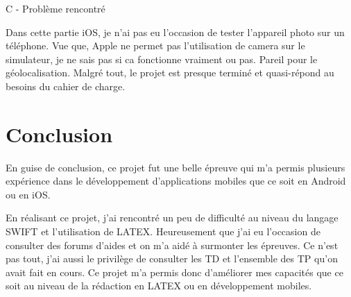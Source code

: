 \documentclass{rapportECL}
\begin{document}
C - Problème rencontré

Dans cette partie iOS, je n'ai pas eu l'occasion de tester l'appareil photo sur un téléphone. Vue que, Apple ne permet pas  l'utilisation de camera sur le simulateur, je ne sais pas si ca fonctionne vraiment ou pas. Pareil pour le géolocalisation. Malgré tout, le projet est presque terminé et quasi-répond au besoins du cahier de charge.

\newpage
\section{Conclusion}

En guise de conclusion, ce projet fut une belle épreuve qui m'a permis plusieurs expérience dans le développement d'applications mobiles que ce soit en Android ou en iOS.

En réalisant ce projet, j'ai rencontré un peu de difficulté au niveau du langage SWIFT\cite{iOS} et l'utilisation de LATEX\cite{Overleaf}. Heureusement que j'ai eu l'occasion de consulter des forums d'aides et on m'a aidé à surmonter les épreuves. Ce n'est pas tout, j'ai aussi le privilège de consulter les TD et l'ensemble des TP qu'on avait fait en cours. Ce projet m'a permis donc d'améliorer mes capacités que ce soit au niveau de la rédaction en LATEX\cite{Overleaf} ou en développement mobiles.
\newpage



\end{document}

